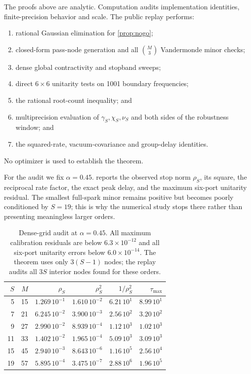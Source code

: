 \documentclass[11pt]{article}
\theoremstyle{definition}
\theoremstyle{remark}
\begin{document}
The proofs above are analytic.  Computation audits implementation identities,
finite-precision behavior and scale.  The public replay performs:
\begin{enumerate}
 \item rational Gaussian elimination for \cref{prop:nogo};
 \item closed-form pass-node generation and all $\binom{M}{3}$ Vandermonde
 minor checks;
 \item dense global contractivity and stopband sweeps;
 \item direct $6\times6$ unitarity tests on 1001 boundary frequencies;
 \item the rational root-count inequality; and
 \item multiprecision evaluation of $\gamma_S,\chi_S,\nu_S$ and both sides of
 the robustness window; and
 \item the squared-rate, vacuum-covariance and group-delay identities.
\end{enumerate}
No optimizer is used to establish the theorem.

For the audit we fix $\alpha=0.45$.   reports the observed
stop norm $\rho_S$, its square, the reciprocal rate factor, the exact peak
delay, and the maximum six-port unitarity residual.  The smallest full-spark
minor remains positive but becomes poorly conditioned by $S=19$; this is why
the numerical study stops there rather than presenting meaningless larger
orders.

\begin{table}[htbp]
\centering
\small
\setlength{\tabcolsep}{4.5pt}
\begin{tabular}{rrrrrr}
\toprule
$S$ & $M$ & $\rho_S$ & $\rho_S^2$ & $1/\rho_S^2$ & $\tau_{\max}$ \\
\midrule
5  & 15 & $1.269\,10^{-1}$ & $1.610\,10^{-2}$ & $6.21\,10^{1}$ & $8.99\,10^{1}$ \\
7  & 21 & $6.245\,10^{-2}$ & $3.900\,10^{-3}$ & $2.56\,10^{2}$ & $3.20\,10^{2}$ \\
9  & 27 & $2.990\,10^{-2}$ & $8.939\,10^{-4}$ & $1.12\,10^{3}$ & $1.02\,10^{3}$ \\
11 & 33 & $1.402\,10^{-2}$ & $1.965\,10^{-4}$ & $5.09\,10^{3}$ & $3.09\,10^{3}$ \\
15 & 45 & $2.940\,10^{-3}$ & $8.643\,10^{-6}$ & $1.16\,10^{5}$ & $2.56\,10^{4}$ \\
19 & 57 & $5.895\,10^{-4}$ & $3.475\,10^{-7}$ & $2.88\,10^{6}$ & $1.96\,10^{5}$ \\
\bottomrule
\end{tabular}
\caption{Dense-grid audit at $\alpha=0.45$.  All maximum calibration
residuals are below $6.3\times10^{-12}$ and all six-port unitarity errors below
$6.0\times10^{-14}$.  The theorem uses only $3(S-1)$ nodes; the replay audits
all $3S$ interior nodes found for these orders.}
\label{tab:audit}
\end{table}
\end{document}
